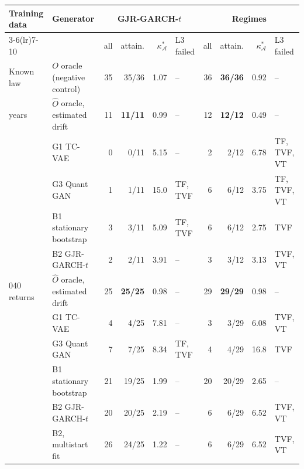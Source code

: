 \begin{tabular}{llrrrlrrrl}
\toprule
Training data & Generator & \multicolumn{4}{c}{GJR-GARCH-$t$} & \multicolumn{4}{c}{Regimes} \\
\cmidrule(lr){3-6}\cmidrule(lr){7-10}
& & all & attain. & $\kappa^\ast_{\mathcal{A}}$ & L3 failed & all & attain. & $\kappa^\ast_{\mathcal{A}}$ & L3 failed \\
\midrule
Known law & $O$ oracle (negative control) & 35 & 35/36 & 1.07 & -- & 36 & \textbf{36/36} & 0.92 & -- \\
\addlinespace
10 years & $\hat{O}$ oracle, estimated drift & 11 & \textbf{11/11} & 0.99 & -- & 12 & \textbf{12/12} & 0.49 & -- \\
 & G1 TC-VAE & 0 & 0/11 & 5.15 & -- & 2 & 2/12 & 6.78 & TF, TVF, VT \\
 & G3 Quant GAN & 1 & 1/11 & 15.0 & TF, TVF & 6 & 6/12 & 3.75 & TF, TVF, VT \\
 & B1 stationary bootstrap & 3 & 3/11 & 5.09 & TF, TVF & 6 & 6/12 & 2.75 & TVF \\
 & B2 GJR-GARCH-$t$ & 2 & 2/11 & 3.91 & -- & 3 & 3/12 & 3.13 & TVF, VT \\
\addlinespace
151{,}040 returns & $\hat{O}$ oracle, estimated drift & 25 & \textbf{25/25} & 0.98 & -- & 29 & \textbf{29/29} & 0.98 & -- \\
 & G1 TC-VAE & 4 & 4/25 & 7.81 & -- & 3 & 3/29 & 6.08 & TVF, VT \\
 & G3 Quant GAN & 7 & 7/25 & 8.34 & TF, TVF & 4 & 4/29 & 16.8 & TVF \\
 & B1 stationary bootstrap & 21 & 19/25 & 1.99 & -- & 20 & 20/29 & 2.65 & -- \\
 & B2 GJR-GARCH-$t$ & 20 & 20/25 & 2.19 & -- & 6 & 6/29 & 6.52 & TVF, VT \\
 & B2, multistart fit & 26 & 24/25 & 1.22 & -- & 6 & 6/29 & 6.52 & TVF, VT \\
\bottomrule
\end{tabular}
